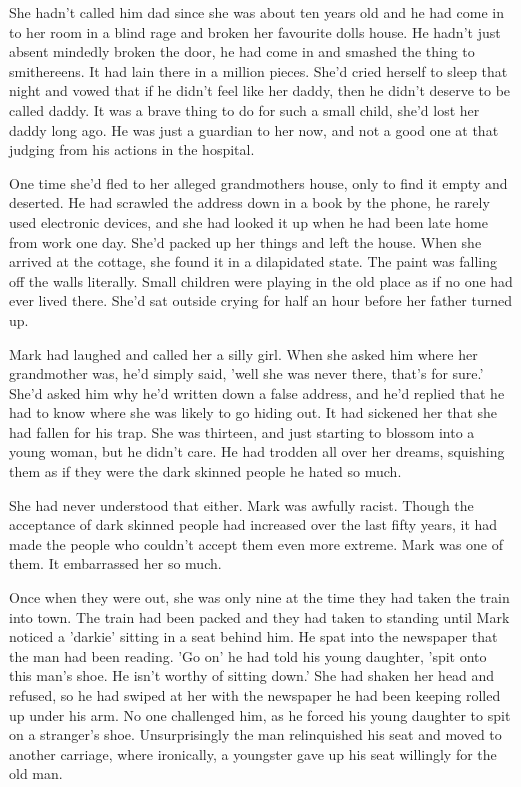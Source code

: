 She hadn't called him dad since she was about ten years old and he had come in to her room in a blind rage and broken her favourite dolls house.  He hadn't just absent mindedly broken the door, he had come in and smashed the thing to smithereens.  It had lain there in a million pieces.  She'd cried herself to sleep that night and vowed that if he didn't feel like her daddy, then he didn't deserve to be called daddy.  It was a brave thing to do for such a small child, she'd lost her daddy long ago.  He was just a guardian to her now, and not a good one at that judging from his actions in the hospital.

One time she'd fled to her alleged grandmothers house, only to find it empty and deserted.  He had scrawled the address down in a book by the phone, he rarely used electronic devices, and she had looked it up when he had been late home from work one day.  She'd packed up her things and left the house.  When she arrived at the cottage, she found it in a dilapidated state.  The paint was falling off the walls literally.  Small children were playing in the old place as if no one had ever lived there.  She'd sat outside crying for half an hour before her father turned up.  

Mark had laughed and called her a silly girl.  When she asked him where her grandmother was, he'd simply said, 'well she was never there, that's for sure.'  She'd asked him why he'd written down a false address, and he'd replied that he had to know where she was likely to go hiding out.  It had sickened her that she had fallen for his trap.  She was thirteen, and just starting to blossom into a young woman, but he didn't care.  He had trodden all over her dreams, squishing them as if they were the dark skinned people he hated so much.

She had never understood that either.  Mark was awfully racist.  Though the acceptance of dark skinned people had increased over the last fifty years, it had made the people who couldn't accept them even more extreme.  Mark was one of them.  It embarrassed her so much.  

Once when they were out, she was only nine at the time they had taken the train into town.  The train had been packed and they had taken to standing until Mark noticed a 'darkie' sitting in a seat behind him.  He spat into the newspaper that the man had been reading.  'Go on' he had told his young daughter, 'spit onto this man's shoe.  He isn't worthy of sitting down.'  She had shaken her head and refused, so he had swiped at her with the newspaper he had been keeping rolled up under his arm.  No one challenged him, as he forced his young daughter to spit on a stranger's shoe.  Unsurprisingly the man relinquished his seat and moved to another carriage, where ironically, a youngster gave up his seat willingly for the old man.



